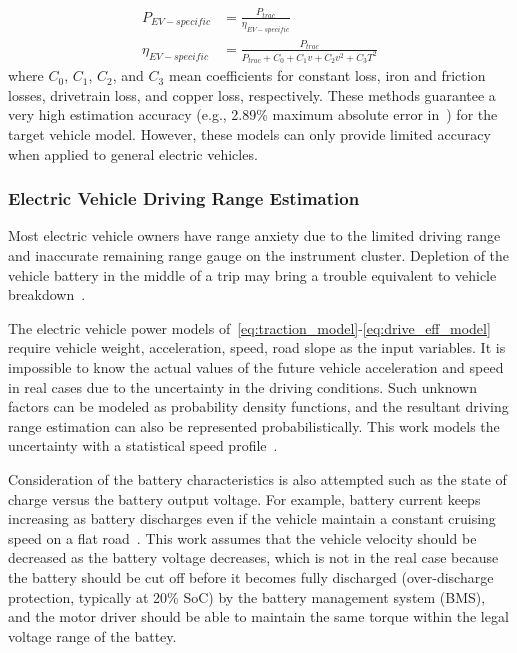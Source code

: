 \begin{align} \label{eq:drive_eff_model}
P_{EV-specific} &= \frac{P_{trac}}{\eta_{EV-specific}} \\
\eta_{EV-specific} &= \frac{P_{trac}}{{P_{trac} + C_0 + C_1 v + C_2 v^2 + C_3 T^2}} \nonumber
\end{align}
%
where $C_0$, $C_1$, $C_2$, and $C_3$ mean coefficients for constant loss, iron and friction
losses, drivetrain loss, and copper loss, respectively. These methods guarantee a very high estimation accuracy (e.g., 2.89\% maximum absolute error in~\cite{Hong:ASPDAC16}) for the target vehicle model. However, these models can only provide limited accuracy when applied to general electric vehicles.

\subsubsection{Electric Vehicle Driving Range Estimation} \label{subsubsec:range_est}

Most electric vehicle owners have range anxiety due to the limited driving range and inaccurate remaining range gauge on the instrument cluster. Depletion of the vehicle battery in the middle of a trip may bring a trouble equivalent to vehicle breakdown~\cite{Hong:ASPDAC16}.

The electric vehicle power models of~\eqref{eq:traction_model}-\eqref{eq:drive_eff_model} require vehicle weight, acceleration, speed, road slope as the input variables. It is impossible to know the actual values of the future vehicle acceleration and speed in real cases due to the uncertainty in the driving conditions. Such unknown factors can be modeled as probability density functions, and the resultant driving range estimation can also be represented probabilistically. This work models the uncertainty with a statistical speed profile~\cite{Oliva:PHM13}.

Consideration of the battery characteristics is also attempted such as the state of charge versus the battery output voltage. For example, battery current keeps increasing as battery discharges even if the vehicle maintain a constant cruising speed on a flat road~\cite{Vaz:JPS14}. This work assumes that the vehicle velocity should be decreased as the battery voltage decreases, which is not in the real case because the battery should be cut off before it becomes fully discharged (over-discharge protection, typically at 20\% SoC) by the battery management system (BMS), and the motor driver should be able to maintain the same torque within the legal voltage range of the battey.

